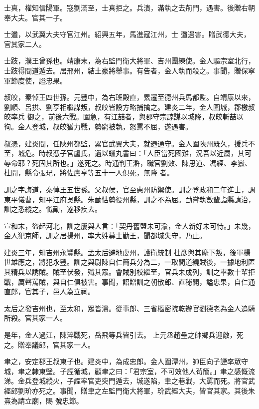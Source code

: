 \begin{pinyinscope}
 士真，權知信陽軍。寇劉滿至，士真拒之。兵潰，滿執之去荊門，遇害。後贈右朝奉大夫。官其一子。



 士遒，以武翼大夫守官江州。紹興五年，馬進寇江州，士
 遒遇害。贈武德大夫，官其家二人。



 士跂，濮王曾孫也。靖康末，為右監門衛大將軍、吉州團練使。金人驅宗室北行，士跂得間道遁去。居邢州，結土豪將舉事。有告者，金人執而殺之。事聞，贈保寧軍節度使，謚忠果。



 叔皎，秦悼王四世孫。元豐中，為右班殿直，累遷至德州兵馬都監。自靖康以來，劉順、呂拱、劉亨相繼謀叛，叔皎皆設方略捕擒之。建炎二年，金人圍城，郡檄叔皎率兵
 御之，前後六戰。圍急，有江喆者，與郡守宗諒謀以城降，叔皎斬喆以徇。金人登城，叔皎猶力戰，勢窮被執，怒罵不屈，遂遇害。



 叔憑，建炎間，任陜州都監，累官武翼大夫，就遷通守。金人圍陜州既久，援兵不至，城危。時叔憑子官盧氏，遺以蠟丸書曰：「人臣當死國難，況吾以近屬，其可辱命耶？死固其所也。」遂死之。時通判王滸，職官劉效、陳思道、馮經、李嶽、杜開，縣令張玘，將佐盧亨等五十一人俱死，無降
 者。



 訓之字誨道，秦悼王五世孫。父叔侯，官至惠州防禦使。訓之登政和二年進士，調東平儀曹，知平江府吳縣。朱勔怙勢役州縣，訓之不為屈。勔嘗執數輩詣縣請治，訓之悉縱之。懺勔，遂移疾去。



 宣和末，盜起河北，訓之屢與人言：「契丹舊盟未可渝，金人新好未可恃。」未幾，金人犯京師，訓之居揚州，率大姓募士勤王，聞都城失守，乃止。



 建炎三年，知吉州永豐縣。孟太后避地虔州，護衛統制
 杜彥與其麾下叛，後軍楊世雄應之，將犯永豐。訓之與尉陳自仁簡兵分為二，一取間道繞賊後，一據地利匿其精兵以誘賊。賊至伏發，殲其眾。會賊別校繼至，官兵未成列，訓之率數十輩拒戰，厲聲罵賊，與自仁俱被害。事聞，詔贈訓之朝散郎、直秘閣，謚忠果，自仁通直郎，官其子，邑人為立祠。



 太后之發吉州也，至太和，眾皆潰。從事郎、三省樞密院乾辦官劉德老為金人追騎所殺。官其家一人。



 是年，金人過江，陳淬戰死，岳飛等兵皆引去。
 上元丞趙壘之帥鄉兵迎敵，死之。贈奉議郎，官其家一人。



 聿之，安定郡王叔東子也。建炎中，為成忠郎。金人圍潭州，帥臣向子諲率眾守城，聿之隸東壁。子諲循城，顧聿之曰：「君宗室，不可效他人茍簡。」聿之感慨流涕。金兵登城縱火，子諲率官吏突門遁去，城遂陷，聿之巷戰，大罵而死。將官武經郎劉玠亦死之。事聞，贈聿之左監門衛大將軍，玠武經大夫，皆官其家。其後朱熹為請立廟，賜
 號忠節。




\end{pinyinscope}
